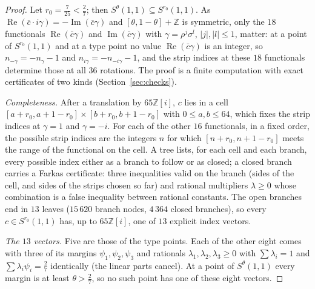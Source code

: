 \documentclass[11pt,a4paper]{amsart}
\theoremstyle{remark}
\newcommand{\Z}{\mathbb{Z}}
\begin{document}
\begin{proof}
Let $r_0=\frac7{25}<\frac27$; then $S^\theta(1,1)\subseteq S^{r_0}(1,1)$. As $\operatorname{Re}(\bar c\cdot
i\gamma)=-\operatorname{Im}(\bar c\gamma)$ and $[\theta,1-\theta]+\Z$ is symmetric, only the $18$ functionals
$\operatorname{Re}(\bar c\gamma)$ and $\operatorname{Im}(\bar c\gamma)$ with $\gamma=\rho^j\sigma^l$, $|j|,|l|\le1$,
matter: at a point of $S^{r_0}(1,1)$ and at a type point no value $\operatorname{Re}(\bar c\gamma)$ is an integer, so
$n_{-\gamma}=-n_\gamma-1$ and $n_{i\gamma}=-n_{-i\gamma}-1$, and the strip indices at these $18$ functionals determine
those at all $36$ rotations. The proof is a finite computation with exact certificates of two kinds
(Section~\ref{sec:checks}).

\emph{Completeness.} After a translation by $65\Z[i]$, $c$ lies in a cell $[a+r_0,a+1-r_0]\times[b+r_0,b+1-r_0]$
with $0\le a,b\le64$, which fixes the strip indices at $\gamma=1$ and $\gamma=-i$. For each of the other $16$
functionals, in a fixed order, the possible strip indices are the integers $n$ for which $[n+r_0,n+1-r_0]$ meets the
range of the functional on the cell. A tree lists, for each cell and each branch, every possible index either as a
branch to follow or as closed; a closed branch carries a Farkas certificate: three inequalities valid on the branch
(sides of the cell, and sides of the strips chosen so far) and rational multipliers $\lambda\ge0$ whose combination
is a false inequality between rational constants. The open branches end in $13$ leaves ($15\,620$ branch nodes,
$4\,364$ closed branches), so every $c\in S^{r_0}(1,1)$ has, up to $65\Z[i]$, one of $13$ explicit index vectors.

\emph{The $13$ vectors.} Five are those of the type points. Each of the other eight comes with three of its margins
$\psi_1,\psi_2,\psi_3$ and rationals $\lambda_1,\lambda_2,\lambda_3\ge0$ with $\sum\lambda_i=1$ and
$\sum\lambda_i\psi_i=\frac27$ identically (the linear parts cancel). At a point of $S^\theta(1,1)$ every margin is at
least $\theta>\frac27$, so no such point has one of these eight vectors.
\end{proof}
\end{document}

